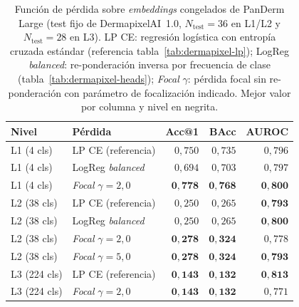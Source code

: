 \begin{table}[H]
\centering
\footnotesize
\setlength{\tabcolsep}{4pt}
\renewcommand{\arraystretch}{0.95}
\caption{Función de pérdida sobre \emph{embeddings} congelados de
PanDerm Large (test fijo de DermapixelAI~1.0,
$N_{\mathrm{test}} = 36$ en L1/L2 y $N_{\mathrm{test}} = 28$ en
L3). LP CE: regresión logística con entropía cruzada estándar
(referencia tabla~\ref{tab:dermapixel-lp}); LogReg
\emph{balanced}: re-ponderación inversa por frecuencia de clase
(tabla~\ref{tab:dermapixel-heads}); \emph{Focal} $\gamma$: pérdida
focal sin re-ponderación con parámetro de focalización indicado.
Mejor valor por columna y nivel en negrita.}
\label{tab:dermapixel-focal}
\begin{tabular}{llrrr}
\hline
Nivel        & Pérdida                                       & Acc@1              & BAcc               & AUROC \\
\hline
L1 (4 cls)   & LP CE (referencia)                            & $0{,}750$          & $0{,}735$          & $0{,}796$ \\
L1 (4 cls)   & LogReg \emph{balanced}                        & $0{,}694$          & $0{,}703$          & $0{,}797$ \\
L1 (4 cls)   & \emph{Focal} $\gamma = 2{,}0$                 & $\mathbf{0{,}778}$ & $\mathbf{0{,}768}$ & $\mathbf{0{,}800}$ \\
\hline
L2 (38 cls)  & LP CE (referencia)                            & $0{,}250$          & $0{,}265$          & $\mathbf{0{,}793}$ \\
L2 (38 cls)  & LogReg \emph{balanced}                        & $0{,}250$          & $0{,}265$          & $\mathbf{0{,}800}$ \\
L2 (38 cls)  & \emph{Focal} $\gamma = 2{,}0$                 & $\mathbf{0{,}278}$ & $\mathbf{0{,}324}$ & $0{,}778$ \\
L2 (38 cls)  & \emph{Focal} $\gamma = 5{,}0$                 & $\mathbf{0{,}278}$ & $\mathbf{0{,}324}$ & $\mathbf{0{,}793}$ \\
\hline
L3 (224 cls) & LP CE (referencia)                            & $\mathbf{0{,}143}$ & $\mathbf{0{,}132}$ & $\mathbf{0{,}813}$ \\
L3 (224 cls) & \emph{Focal} $\gamma = 2{,}0$                 & $\mathbf{0{,}143}$ & $\mathbf{0{,}132}$ & $0{,}771$ \\
\hline
\end{tabular}
\end{table}

